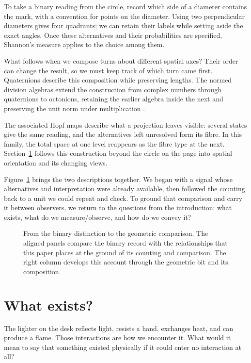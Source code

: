 \documentclass[11pt,a4paper]{article}
\theoremstyle{definition}
\begin{document}
To take a binary reading from the circle, record which side of a
diameter contains the mark, with a convention for points on the
diameter. Using two perpendicular diameters gives four quadrants;
we can retain their labels while setting aside the exact angles.
Once these alternatives and their probabilities are specified,
Shannon's measure applies to the choice among them.

What follows when we compose turns about different spatial axes?
Their order can change the result, so we must keep track of which
turn came first. Quaternions describe this composition while
preserving lengths. The normed division algebras extend the
construction from complex numbers through quaternions to octonions,
retaining the earlier algebra inside the next and preserving the
unit norm under multiplication \citep{Baez2002}.

The associated Hopf maps describe what a projection leaves visible:
several states give the same reading, and the alternatives left
unresolved form its fibre. In this family, the total space at one
level reappears as the fibre type at the next. Section~\ref{sec:v1-physical}
follows this construction beyond the circle on the page into
spatial orientation and its changing views.

Figure~\ref{fig:v1-two-bits} brings the two descriptions together.
We began with a signal whose alternatives and interpretation were
already available, then followed the counting back to a unit we
could repeat and check. To ground that comparison and carry it
between observers, we return to the questions from the introduction:
what exists, what do we measure/observe, and how do we convey it?

\begin{figure}[p]
\centering

\caption{From the binary distinction to the geometric comparison.
The aligned panels compare the binary record with the relationships
that this paper places at the ground of its counting and comparison.
The right column develops this account through the geometric bit
and its composition.}
\label{fig:v1-two-bits}
\end{figure}
\FloatBarrier

\section{What exists?}
\label{sec:v1-physical}

The lighter on the desk reflects light, resists a hand, exchanges heat,
and can produce a flame. Those interactions are how we encounter it.
What would it mean to say that something existed physically if it
could enter no interaction at all?
\end{document}

